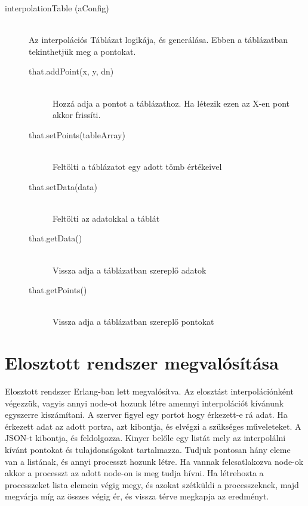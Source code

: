 \begin{description}
		\item[interpolationTable (aConfig)]
			\hfill \\ 
				Az interpolációs Táblázat logikája, és generálása. Ebben a táblázatban tekinthetjük meg a pontokat.
			\begin{description}
			\item[that.addPoint(x, y, dn)] 
			\hfill \\ Hozzá adja a pontot a táblázathoz. Ha létezik ezen az X-en pont akkor frissíti.
			\item[that.setPoints(tableArray)] 
			\hfill \\ Feltölti a táblázatot egy adott tömb értékeivel
			\item[that.setData(data)] 
			\hfill \\ Feltölti az adatokkal a táblát
			\item[that.getData()] 
			\hfill \\ Vissza adja a táblázatban szereplő adatok
			\item[that.getPoints()] 
			\hfill \\ Vissza adja a táblázatban szereplő pontokat
			\end{description}
	\end{description}



\section{Elosztott rendszer  megvalósítása}
Elosztott rendszer Erlang-ban lett megvalósítva. Az elosztást interpolációnként végezzük, vagyis annyi node-ot hozunk létre amennyi interpolációt kívánunk egyszerre kiszámítani. \newline
A szerver figyel egy portot hogy érkezett-e rá adat. Ha érkezett adat az adott portra, azt kibontja, és elvégzi a szükséges műveleteket. A JSON-t kibontja, és feldolgozza. Kinyer belőle egy listát mely az interpolálni kívánt pontokat és tulajdonságokat tartalmazza. \newline
Tudjuk pontosan hány eleme van a listának, és annyi processzt hozunk létre. Ha vannak felcsatlakozva node-ok akkor a processzt az adott node-on is meg tudja hívni.
Ha létrehozta a processzeket lista elemein végig megy, és azokat szétküldi a processzeknek, majd megvárja míg az összes végig ér, és vissza térve megkapja az eredményt.

